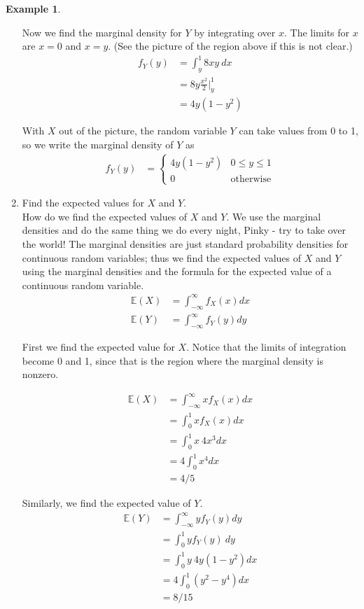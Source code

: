 \documentclass[12pt]{article}
\theoremstyle{definition}
\newtheorem*{example}{Example}
\theoremstyle{remark}
\def\E{{\mathbb E}}
\begin{document}
\begin{example}
\begin{enumerate}
Now we find the marginal density for $Y$ by integrating over $x$. The limits for $x$ are $x = 0$ and $x = y$. (See the picture of the region above if this is not clear.) 
\begin{align*}
f_Y(y) &= \int_y^1 8 x y \: dx \\
&= 8y \frac{x^2}{2} \Bigr|_y^1 \\
&= 4y(1 - y^2)
\end{align*}

With $X$ out of the picture, the random variable $Y$ can take values from 0 to 1, so we write the marginal density of $Y$ as
\begin{align*}
f_Y(y) &=  \begin{cases}
  4y(1 - y^2) & 0 \leq y \leq 1 \\
  0 & \textrm{otherwise}
   \end{cases}
\end{align*}

\item Find the expected values for $X$ and $Y$.\\

How do we find the expected values of $X$ and $Y$. We use the marginal densities and do the same thing we do every night, Pinky - try to take over the world! The marginal densities are just standard probability densities for continuous random variables; thus we find the expected values of $X$ and $Y$ using the marginal densities and the formula for the expected value of a continuous random variable.
\begin{align*}
\E(X) &= \int_{-\infty}^\infty f_X(x) dx \\
\E(Y) &= \int_{-\infty}^\infty f_Y(y) dy
\end{align*}

First we find the expected value for $X$. Notice that the limits of integration become 0 and 1, since that is the region where the marginal density is nonzero.

\begin{align*}
\E(X) &= \int_{-\infty}^\infty x f_X(x) dx \\
&= \int_0^1 x f_X(x) dx \\
&= \int_0^1 x \: 4 x^3 dx \\
&= 4 \int_0^1 x^4 dx \\
&= 4/5
\end{align*}

Similarly, we find the expected value of $Y$.
\begin{align*}
\E(Y) &= \int_{-\infty}^\infty y f_Y(y) dy \\
&= \int_0^1 y f_Y(y) \: dy \\
&= \int_0^1 y \: 4y(1 - y^2) dx \\
&= 4 \int_0^1 (y^2 - y^4) dx \\
&= 8/15
\end{align*}
\end{enumerate}
\end{example}
\end{document}
